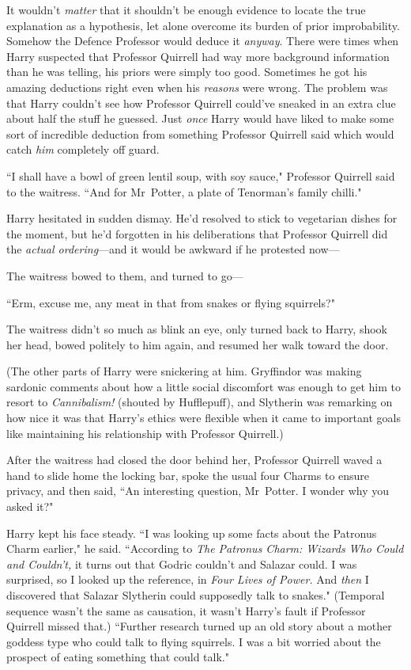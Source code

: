 It wouldn't \emph{matter} that it shouldn't be enough evidence to locate the true explanation as a hypothesis, let alone overcome its burden of prior improbability. Somehow the Defence Professor would deduce it \emph{anyway}. There were times when Harry suspected that Professor Quirrell had way more background information than he was telling, his priors were simply too good. Sometimes he got his amazing deductions right even when his \emph{reasons} were wrong. The problem was that Harry couldn't see how Professor Quirrell could've sneaked in an extra clue about half the stuff he guessed. Just \emph{once} Harry would have liked to make some sort of incredible deduction from something Professor Quirrell said which would catch \emph{him} completely off guard.

\later

``I shall have a bowl of green lentil soup, with soy sauce," Professor Quirrell said to the waitress. ``And for Mr~Potter, a plate of Tenorman's family chilli."

Harry hesitated in sudden dismay. He'd resolved to stick to vegetarian dishes for the moment, but he'd forgotten in his deliberations that Professor Quirrell did the \emph{actual ordering}—and it would be awkward if he protested now—

The waitress bowed to them, and turned to go—

``Erm, excuse me, any meat in that from snakes or flying squirrels?"

The waitress didn't so much as blink an eye, only turned back to Harry, shook her head, bowed politely to him again, and resumed her walk toward the door.

(The other parts of Harry were snickering at him. Gryffindor was making sardonic comments about how a little social discomfort was enough to get him to resort to \emph{Cannibalism!} (shouted by Hufflepuff), and Slytherin was remarking on how nice it was that Harry's ethics were flexible when it came to important goals like maintaining his relationship with Professor Quirrell.)

After the waitress had closed the door behind her, Professor Quirrell waved a hand to slide home the locking bar, spoke the usual four Charms to ensure privacy, and then said, ``An interesting question, Mr~Potter. I wonder why you asked it?"

Harry kept his face steady. ``I was looking up some facts about the Patronus Charm earlier," he said. ``According to \emph{The Patronus Charm: Wizards Who Could and Couldn't,} it turns out that Godric couldn't and Salazar could. I was surprised, so I looked up the reference, in \emph{Four Lives of Power.} And \emph{then} I discovered that Salazar Slytherin could supposedly talk to snakes." (Temporal sequence wasn't the same as causation, it wasn't Harry's fault if Professor Quirrell missed that.) ``Further research turned up an old story about a mother goddess type who could talk to flying squirrels. I was a bit worried about the prospect of eating something that could talk."

